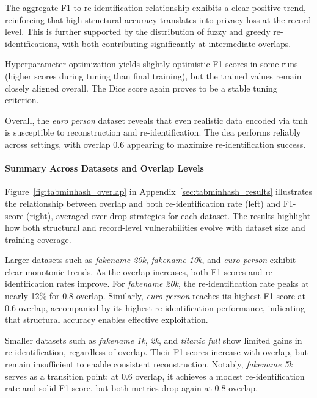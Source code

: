 The aggregate F1-to-re-identification relationship exhibits a clear positive trend, reinforcing that high structural accuracy translates into privacy loss at the record level.
This is further supported by the distribution of fuzzy and greedy re-identifications, with both contributing significantly at intermediate overlaps.

Hyperparameter optimization yields slightly optimistic F1-scores in some runs (higher scores during tuning than final training), but the trained values remain closely aligned overall.
The Dice score again proves to be a stable tuning criterion.

Overall, the \textit{euro person} dataset reveals that even realistic data encoded via \ac{tmh} is susceptible to reconstruction and re-identification.
The \ac{dea} performs reliably across settings, with overlap 0.6 appearing to maximize re-identification success.


\paragraph{Summary Across Datasets and Overlap Levels}

Figure~\ref{fig:tabminhash_overlap} in Appendix~\ref{sec:tabminhash_results} illustrates the relationship between overlap and both re-identification rate (left) and F1-score (right), averaged over drop strategies for each dataset.
The results highlight how both structural and record-level vulnerabilities evolve with dataset size and training coverage.

Larger datasets such as \textit{fakename 20k}, \textit{fakename 10k}, and \textit{euro person} exhibit clear monotonic trends.
As the overlap increases, both F1-scores and re-identification rates improve.
For \textit{fakename 20k}, the re-identification rate peaks at nearly 12\% for 0.8 overlap.
Similarly, \textit{euro person} reaches its highest F1-score at 0.6 overlap, accompanied by its highest re-identification performance, indicating that structural accuracy enables effective exploitation.

Smaller datasets such as \textit{fakename 1k}, \textit{2k}, and \textit{titanic full} show limited gains in re-identification, regardless of overlap.
Their F1-scores increase with overlap, but remain insufficient to enable consistent reconstruction.
Notably, \textit{fakename 5k} serves as a transition point: at 0.6 overlap, it achieves a modest re-identification rate and solid F1-score, but both metrics drop again at 0.8 overlap.

